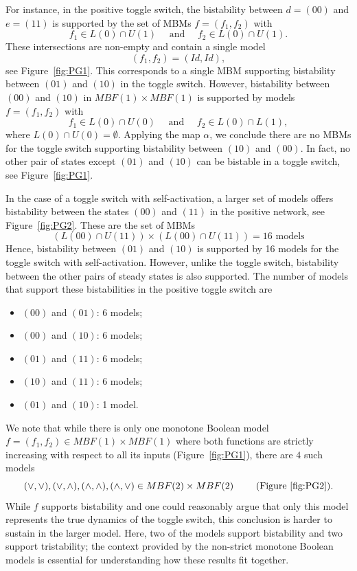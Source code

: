 \documentclass[10pt,letterpaper]{article}
\begin{document}
For instance, in the positive toggle switch, the bistability between $d=(00)$ and $e=(11)$ is supported by the set of MBMs $f=(f_1,f_2)$
with 
\[ f_1\in L(0) \cap U(1) \quad \mbox{ and } \quad f_2\in L(0) \cap U(1).\]
These intersections are non-empty and contain a single model 
\[ (f_1, f_2) = (Id, Id),\]
see Figure~\ref{fig:PG1}. This corresponds to a single MBM supporting bistability between $(01)$ and $(10)$ in the toggle switch.
However, bistability between $(00)$ and $(10)$ in $MBF(1) \times MBF(1)$
 is supported by models $f=(f_1,f_2)$
with 
\[ f_1\in L(0) \cap U(0) \quad \mbox{ and } \quad f_2\in L(0) \cap L(1),\]
where $L(0) \cap U(0) =\emptyset$. Applying the map $\alpha$, we conclude there are no MBMs for the toggle switch supporting bistability between $(10)$ and $(00)$. In fact, no other pair of states except $(01)$ and $(10)$ can be bistable in a toggle switch, see Figure~\ref{fig:PG1}.

In the case of a toggle switch with self-activation, a larger set of models offers bistability between the states $(00)$ and $(11)$ in the positive network, see Figure~\ref{fig:PG2}. These are the set of MBMs 
\[(L(00) \cap U(11)) \times (L(00) \cap U(11)) = 16 \mbox{ models}\] Hence, bistability between $(01)$ and $(10)$ is supported by 16 models for the toggle switch with self-activation. However, unlike the toggle switch, bistability between the other pairs of steady states is also supported. The number of models that support these bistabilities in the positive toggle switch  are
\begin{itemize}
    \item $(00)$ and $(01)$: 6 models;
    \item $(00)$ and $(10)$: 6 models;
    \item $(01)$ and $(11)$: 6 models;
    \item $(10)$ and $(11)$: 6 models;
    \item $(01)$ and $(10)$: 1 model.
\end{itemize}


 We note that while there is only one monotone Boolean model $f=(f_1,f_2) \in MBF(1)\times MBF(1)$ where both functions are  strictly increasing with respect to all its inputs (Figure~\ref{fig:PG1}), there are $4$ such models  
\[(\vee, \vee), (\vee, \wedge),(\wedge, \wedge),(\wedge, \vee) \in MBF(2)\times MBF(2) \qquad \mbox{ (Figure~\ref{fig:PG2})} .\]
While $f$ supports bistability and one could reasonably argue that only this model represents the true dynamics of the toggle switch, this conclusion is harder to sustain in the larger model. Here, two of the models support bistability and two support tristability; the context provided by the non-strict monotone Boolean models is essential for understanding how these results fit together.  
\end{document}
